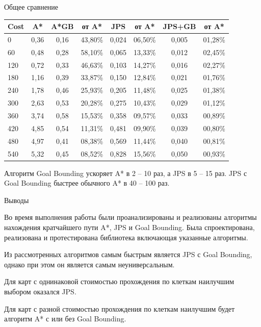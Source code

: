 \documentclass{beamer}
\begin{document}
\begin{frame}{Общее сравнение}{}

\hspace{-1.5em}
	\begin{tabular}{|l|c|c|c|c|c|c|c|}
		\hline
Cost& A* & A*GB& от A* &JPS& от A*&JPS+GB& от A* \\
\hline 	
0	& 0,36	& 0,16	& 43,80\%	& 0,024	& 06,50\%	& 0,005 & 01,28\% \\
\hline
60	& 0,48	& 0,28	& 58,10\%	& 0,065	& 13,33\%	& 0,012 & 02,45\% \\
\hline
120	& 0,72	& 0,33	& 46,63\%	& 0,103	& 14,27\%	& 0,016 & 02,27\% \\
\hline
180	& 1,16	& 0,39	& 33,87\%	& 0,150	& 12,84\%	& 0,021 & 01,76\% \\
\hline
240	& 1,78	& 0,46	& 25,93\%	& 0,205	& 11,48\%	& 0,025 & 01,38\% \\
\hline
300	& 2,63	& 0,53	& 20,28\%	& 0,275	& 10,43\%	& 0,029 & 01,12\% \\
\hline
360	& 3,74	& 0,58	& 15,53\%	& 0,358	& 09,57\%	& 0,033 & 00,89\% \\
\hline
420	& 4,85	& 0,54	& 11,31\%	& 0,481	& 09,90\%	& 0,039 & 00,80\% \\
\hline
480	& 4,97	& 0,41	& 08,38\%	& 0,569	& 11,44\%	& 0,040 & 00,81\% \\
\hline
540	& 5,32	& 0,45	& 08,52\%	& 0,828	& 15,56\%	& 0,050 & 00,93\% \\
\hline
	\end{tabular}

\vspace{0.5\baselineskip}

Алгоритм Goal Bounding ускоряет A* в 2 -- 10 раз, а JPS в 5 -- 15 раз. JPS с Goal Bounding быстрее обычного A* в 40 -- 100 раз.

\end{frame}

\begin{frame}{Выводы}{}

\setlength\parindent{24pt}

Во время выполнения работы были проанализированы и реализованы алгоритмы нахождения кратчайшего пути A*, JPS и Goal Bounding. Была спроектирована, реализована и протестирована библиотека включающая указанные алгоритмы.

Из рассмотренных алгоритмов самым быстрым является JPS с Goal Bounding, однако при этом он является самым неуниверсальным. 

Для карт с однинаковой стоимостью прохождения по клеткам наилучшим выбором оказался JPS. 

Для карт с разной стоимостью прохождения по клеткам наилучшим будет алгоритм A* с или без Goal Bounding.

\end{frame}
\end{document}
